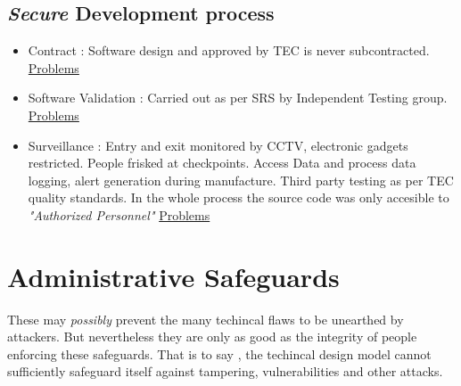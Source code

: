 \documentclass[12pt]{report}
\begin{document}
\subsection{\textit{Secure} Development process}
\begin{itemize}
  \item Contract : Software design and approved by TEC is never subcontracted. \hyperref[sec:contract]{Problems}
  \item Software Validation : Carried out as per SRS by Independent Testing group. \hyperref[sec:contract]{Problems}
  \item Surveillance : Entry and exit monitored by CCTV, electronic gadgets restricted. People frisked at checkpoints. Access Data and process data logging, alert generation during manufacture. Third party testing as per TEC quality standards. In the whole process the source code was only accesible to \textit{"Authorized Personnel"} \hyperref[sec:surv]{Problems}
\end{itemize}



\section{Administrative Safeguards}
These may \textit{possibly} prevent the many techincal flaws to be unearthed by attackers. But nevertheless they are only as good as the integrity of people enforcing these safeguards. That is to say , the techincal design model cannot sufficiently safeguard itself against tampering, vulnerabilities and other attacks.
\end{document}
